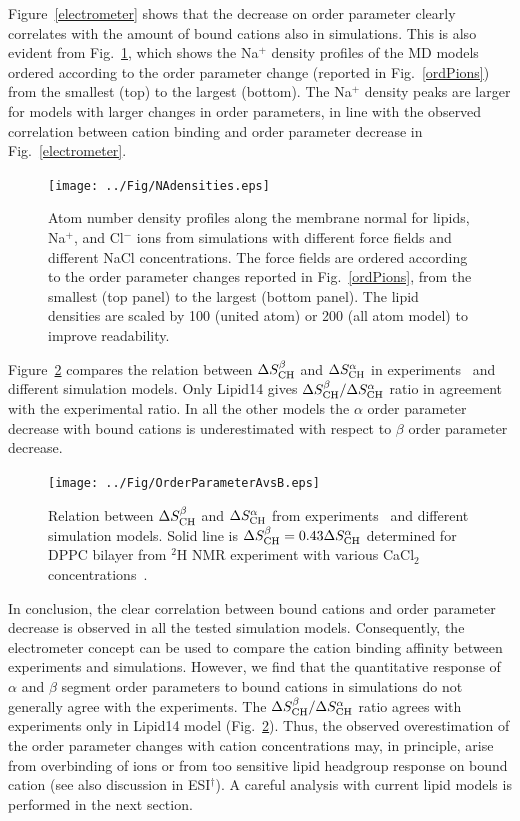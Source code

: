 \documentclass[twoside,twocolumn,9pt]{article}
\begin{document}
Figure~\ref{electrometer} shows that the decrease on order parameter clearly correlates with the
amount of bound cations also in simulations. This is also evident from Fig.~\ref{NAdensities},
which shows the Na$^+$ density profiles of the MD models
ordered according to the order parameter change 
(reported in Fig.~\ref{ordPions}) from the smallest (top) to the largest (bottom).
The Na$^+$ density peaks are larger for models with larger changes in order parameters,
in line with the observed correlation between cation binding and order parameter decrease in
Fig.~\ref{electrometer}.
\begin{figure}[t]
  \centering
  \texttt{[image: ../Fig/NAdensities.eps]}
  \caption{\label{NAdensities}
    Atom number density profiles along the membrane normal for lipids, Na$^+$, and Cl$^-$ ions 
    from simulations with different force fields and different NaCl concentrations. 
    The force fields are ordered according to the order parameter changes 
    reported in Fig.~\ref{ordPions}, from the smallest (top panel) to the largest (bottom panel).
    The lipid densities are scaled by 100 (united atom) or 200 (all atom model) to improve readability. 
}
\end{figure}

Figure~\ref{AvsB} compares the relation between $\Delta S_{\rm{CH}}^{\beta}$ and $\Delta S_{\rm{CH}}^{\alpha}$
in experiments~\cite{akutsu81} and different simulation models.
Only Lipid14 gives $\Delta S_{\rm{CH}}^{\beta}/\Delta S_{\rm{CH}}^{\alpha}$ ratio in agreement with the experimental ratio.
In all the other models the $\alpha$ order parameter decrease with bound cations is underestimated with
respect to $\beta$ order parameter decrease.
\begin{figure}[t]
  \centering
  \texttt{[image: ../Fig/OrderParameterAvsB.eps]}
  \caption{\label{AvsB}
    Relation between $\Delta S_{\rm{CH}}^{\beta}$ and $\Delta S_{\rm{CH}}^{\alpha}$ from experiments~\cite{akutsu81} and
    different simulation models. Solid line is $\Delta S_{\rm{CH}}^{\beta}=0.43\Delta S_{\rm{CH}}^{\alpha}$ determined for DPPC bilayer
    from $^2$H NMR experiment with various CaCl$_2$ concentrations~\cite{akutsu81}.
  }
\end{figure}




In conclusion, the clear correlation between bound cations and order parameter decrease 
is observed in all the tested simulation models. Consequently, the electrometer concept can 
be used to compare the cation binding affinity between experiments and simulations. 
However, we find that the quantitative response of $\alpha$ and $\beta$ segment order parameters to bound cations in simulations 
do not generally agree with the experiments. The $\Delta S_{\rm{CH}}^{\beta}/\Delta S_{\rm{CH}}^{\alpha}$ ratio  
agrees with experiments only in Lipid14 model (Fig.~\ref{AvsB}). 
Thus, the observed overestimation of the order parameter changes with cation concentrations may, in principle, arise
from overbinding of ions or from too sensitive lipid headgroup response on bound cation 
(see also discussion in ESI$^\dag$). 
A careful analysis with current lipid models is performed in the next section.
\end{document}
